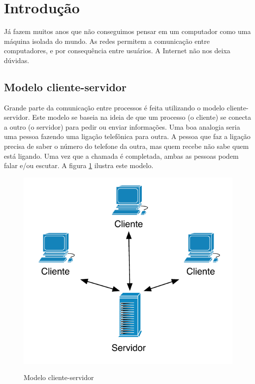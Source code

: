 \documentclass[a4paper,10pt]{article}
\begin{document}

\tableofcontents
\pagebreak

\section{Introdução}

Já fazem muitos anos que não conseguimos pensar em um computador como uma
máquina isolada do mundo. As redes permitem a comunicação entre computadores, e
por consequência entre usuários. A Internet não nos deixa dúvidas.

\subsection{Modelo cliente-servidor}
Grande parte da comunicação entre processos é feita utilizando o modelo
cliente-servidor. Este modelo se baseia na ideia de que um processo (o cliente)
se conecta a outro (o servidor) para pedir ou enviar informações. Uma boa
analogia seria uma pessoa fazendo uma ligação telefônica para outra. A pessoa
que faz a ligação precisa de saber o número do telefone da outra, mas quem
recebe não sabe quem está ligando. Uma vez que a chamada é completada, ambas as
pessoas podem falar e/ou escutar. A figura \ref{fig:clienteservidor} ilustra
este modelo.

\begin{figure}[ht!]
\begin{center}
\includegraphics[scale=0.7]{imagens/clienteservidor.pdf}
\label{fig:clienteservidor}
\caption{Modelo cliente-servidor}
\end{center}
\end{figure}
\end{document}
